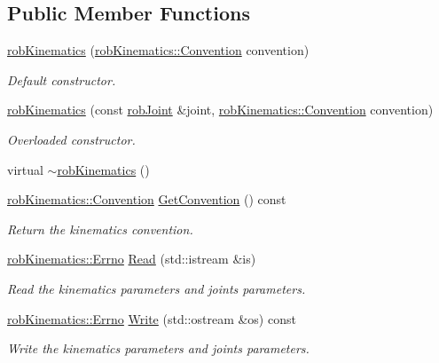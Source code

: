 \subsection*{Public Member Functions}
\begin{DoxyCompactItemize}
\item 
\hyperlink{classrob_kinematics_a0f56a8fda948108fb7e3319d9f252264}{rob\-Kinematics} (\hyperlink{classrob_kinematics_a298703e920da583d1f6aa60c8f65ca78}{rob\-Kinematics\-::\-Convention} convention)
\begin{DoxyCompactList}\small\item\em Default constructor. \end{DoxyCompactList}\item 
\hyperlink{classrob_kinematics_a958b1b337dd1dfc9529af6756803f1a5}{rob\-Kinematics} (const \hyperlink{classrob_joint}{rob\-Joint} \&joint, \hyperlink{classrob_kinematics_a298703e920da583d1f6aa60c8f65ca78}{rob\-Kinematics\-::\-Convention} convention)
\begin{DoxyCompactList}\small\item\em Overloaded constructor. \end{DoxyCompactList}\item 
virtual \hyperlink{classrob_kinematics_aecaa7ea272fa769c80e322a4e85d9e52}{$\sim$rob\-Kinematics} ()
\item 
\hyperlink{classrob_kinematics_a298703e920da583d1f6aa60c8f65ca78}{rob\-Kinematics\-::\-Convention} \hyperlink{classrob_kinematics_a9f60e9d388339a67afda4ea108e58b0b}{Get\-Convention} () const 
\begin{DoxyCompactList}\small\item\em Return the kinematics convention. \end{DoxyCompactList}\item 
\hyperlink{classrob_joint_a6656cb0c2f8c9aadf0c446abd6bebed7}{rob\-Kinematics\-::\-Errno} \hyperlink{classrob_kinematics_a914647c840e02cc10eaa1fe90dc29ac9}{Read} (std\-::istream \&is)
\begin{DoxyCompactList}\small\item\em Read the kinematics parameters and joints parameters. \end{DoxyCompactList}\item 
\hyperlink{classrob_joint_a6656cb0c2f8c9aadf0c446abd6bebed7}{rob\-Kinematics\-::\-Errno} \hyperlink{classrob_kinematics_a0d286834b4f10f80da0af230aadaf154}{Write} (std\-::ostream \&os) const 
\begin{DoxyCompactList}\small\item\em Write the kinematics parameters and joints parameters. \end{DoxyCompactList}\item 

\end{DoxyCompactItemize}
